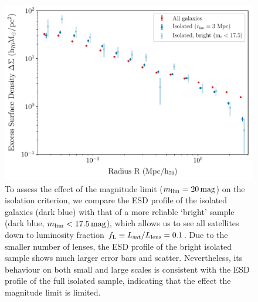 \documentclass[usenatbib]{mnras}
\newcommand{\magn}{\, {\rm mag} }
\newcommand{\un}[1]{_{\rm #1}}
\begin{document}
\begin{figure}
	\includegraphics[width=1.0\columnwidth]{Figures/ESD_KiDS_isotest.pdf}
	\caption{To assess the effect of the magnitude limit ($m\un{lim}=20 \magn$) on the isolation criterion, we compare the ESD profile of the isolated galaxies (dark blue) with that of a more reliable `bright' sample (dark blue, $m\un{lim}<17.5 \magn$), which allows us to see all satellites down to luminosity fraction $f\un{L} \equiv L\un{sat}/L\un{lens}=0.1$. Due to the smaller number of lenses, the ESD profile of the bright isolated sample shows much larger error bars and scatter. Nevertheless, its behaviour on both small and large scales is consistent with the ESD profile of the full isolated sample, indicating that the effect the magnitude limit is limited.}
	\label{fig:isolation_test_ESD}
\end{figure}
\end{document}
